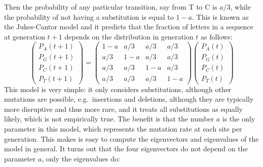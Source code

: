 \documentclass[
  letterpaper,
  DIV=11,
  numbers=noendperiod]{scrreprt}
\begin{document}
Then the probability of any particular transition, say from T to C is
\(a/3\), while the probability of not having a substitution is equal to
\(1-a\). This is known as the Jukes-Cantor model and it predicts that
the fraction of letters in a sequence at generation \(t+1\) depends on
the distribution in generation \(t\) as follows:
\[  \left(\begin{array}{c} P_A(t+1) \\ P_G(t+1) \\ P_C(t+1) \\ P_T(t+1) \end{array}\right) = \left(\begin{array}{cccc}1-a & a/3 & a/3 & a/3 \\a/3 & 1-a & a/3 & a/3 \\a/3 & a/3 & 1-a & a/3 \\a/3 & a/3 & a/3 & 1-a\end{array}\right) \left(\begin{array}{c} P_A(t) \\ P_G(t) \\ P_C(t) \\ P_T(t) \end{array}\right) \]
This model is very simple: it only considers substitutions, although
other mutations are possible, e.g.~insertions and deletions, although
they are typically more disruptive and thus more rare, and it treats all
substitutions as equally likely, which is not empirically true. The
benefit is that the number \(a\) is the only parameter in this model,
which represents the mutation rate at each site per generation. This
makes is easy to compute the eigenvectors and eigenvalues of the model
in general. It turns out that the four eigenvectors do not depend on the
parameter \(a\), only the eigenvalues do:
\end{document}
